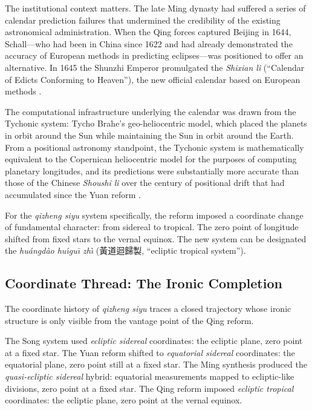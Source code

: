 \documentclass[10pt,a4paper]{article}
\newcommand{\zh}[1]{#1}
\begin{document}
The institutional context matters.  The late Ming dynasty had
suffered a series of calendar prediction failures that undermined
the credibility of the existing astronomical administration.  When
the Qing forces captured Beijing in 1644, Schall---who had been in
China since 1622 and had already demonstrated the accuracy of
European methods in predicting eclipses---was positioned to offer an
alternative.  In 1645 the Shunzhi Emperor promulgated the
\textit{Shixian li} (``Calendar of Edicts
Conforming to Heaven''), the new official calendar based on European
methods \cite{liu2020missionary}.

The computational infrastructure underlying the calendar was drawn
from the Tychonic system: Tycho Brahe's geo-heliocentric model,
which placed the planets in orbit around the Sun while maintaining
the Sun in orbit around the Earth.  From a positional astronomy
standpoint, the Tychonic system is mathematically equivalent to the
Copernican heliocentric model for the purposes of computing planetary
longitudes, and its predictions were substantially more accurate
than those of the Chinese \textit{Shoushi li} over the century of positional
drift that had accumulated since the Yuan reform \cite{jami2015calendar}.

For the \textit{qizheng siyu} system specifically, the reform imposed a
coordinate change of fundamental character: from sidereal to tropical.
The zero point of longitude shifted from fixed stars to the vernal
equinox.  The new system can be designated the
\textit{hu\'angd\`ao hu\'{\i}gu\={\i} zh\`{\i}} (\zh{黃道迴歸製},
``ecliptic tropical system'').

\subsection*{Coordinate Thread: The Ironic Completion}

The coordinate history of \textit{qizheng siyu} traces a closed trajectory
whose ironic structure is only visible from the vantage point of
the Qing reform.

The Song system used \textit{ecliptic sidereal} coordinates: the
ecliptic plane, zero point at a fixed star.  The Yuan reform
shifted to \textit{equatorial sidereal} coordinates: the equatorial
plane, zero point still at a fixed star.  The Ming synthesis
produced the \textit{quasi-ecliptic sidereal} hybrid: equatorial
measurements mapped to ecliptic-like divisions, zero point at a
fixed star.  The Qing reform imposed \textit{ecliptic tropical}
coordinates: the ecliptic plane, zero point at the vernal equinox.
\end{document}
